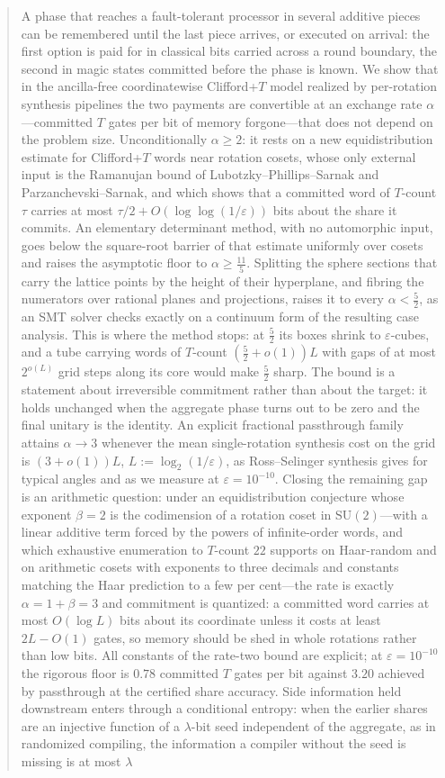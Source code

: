 \documentclass[aps,prx,twocolumn,superscriptaddress,nofootinbib,longbibliography]{revtex4-2}
\theoremstyle{plain}
\theoremstyle{definition}
\theoremstyle{remark}
\newcommand{\SU}{\mathrm{SU}(2)}
\begin{document}
\begin{abstract}
A phase that reaches a fault-tolerant processor in several additive pieces can be remembered until the last piece arrives, or executed on arrival: the first option is paid for in classical bits carried across a round boundary, the second in magic states committed before the phase is known. We show that in the ancilla-free coordinatewise Clifford+$T$ model realized by per-rotation synthesis pipelines the two payments are convertible at an exchange rate $\alpha$---committed $T$ gates per bit of memory forgone---that does not depend on the problem size. Unconditionally $\alpha\ge2$: it rests on a new equidistribution estimate for Clifford+$T$ words near rotation cosets, whose only external input is the Ramanujan bound of Lubotzky--Phillips--Sarnak and Parzanchevski--Sarnak, and which shows that a committed word of $T$-count $\tau$ carries at most $\tau/2+O(\log\log(1/\varepsilon))$ bits about the share it commits. An elementary determinant method, with no automorphic input, goes below the square-root barrier of that estimate uniformly over cosets and raises the asymptotic floor to $\alpha\ge\tfrac{11}5$. Splitting the sphere sections that carry the lattice points by the height of their hyperplane, and fibring the numerators over rational planes and projections, raises it to every $\alpha<\tfrac52$, as an SMT solver checks exactly on a continuum form of the resulting case analysis. This is where the method stops: at $\tfrac52$ its boxes shrink to $\varepsilon$-cubes, and a tube carrying words of $T$-count $(\tfrac52+o(1))L$ with gaps of at most $2^{o(L)}$ grid steps along its core would make $\tfrac52$ sharp. The bound is a statement about irreversible commitment rather than about the target: it holds unchanged when the aggregate phase turns out to be zero and the final unitary is the identity. An explicit fractional passthrough family attains $\alpha\to3$ whenever the mean single-rotation synthesis cost on the grid is $(3+o(1))L$, $L:=\log_2(1/\varepsilon)$, as Ross--Selinger synthesis gives for typical angles and as we measure at $\varepsilon=10^{-10}$. Closing the remaining gap is an arithmetic question: under an equidistribution conjecture whose exponent $\beta=2$ is the codimension of a rotation coset in $\SU$---with a linear additive term forced by the powers of infinite-order words, and which exhaustive enumeration to $T$-count $22$ supports on Haar-random and on arithmetic cosets with exponents to three decimals and constants matching the Haar prediction to a few per cent---the rate is exactly $\alpha=1+\beta=3$ and commitment is quantized: a committed word carries at most $O(\log L)$ bits about its coordinate unless it costs at least $2L-O(1)$ gates, so memory should be shed in whole rotations rather than low bits. All constants of the rate-two bound are explicit; at $\varepsilon=10^{-10}$ the rigorous floor is $0.78$ committed $T$ gates per bit against $3.20$ achieved by passthrough at the certified share accuracy. Side information held downstream enters through a conditional entropy: when the earlier shares are an injective function of a $\lambda$-bit seed independent of the aggregate, as in randomized compiling, the information a compiler without the seed is missing is at most $\lambda$ 
\end{abstract}
\end{document}

